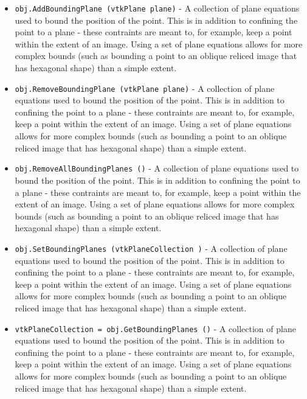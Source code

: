 \begin{itemize}
\item  \verb|obj.AddBoundingPlane (vtkPlane plane)| -  A collection of plane equations used to bound the position of the point.
 This is in addition to confining the point to a plane - these contraints
 are meant to, for example, keep a point within the extent of an image.
 Using a set of plane equations allows for more complex bounds (such as
 bounding a point to an oblique reliced image that has hexagonal shape)
 than a simple extent.

\item  \verb|obj.RemoveBoundingPlane (vtkPlane plane)| -  A collection of plane equations used to bound the position of the point.
 This is in addition to confining the point to a plane - these contraints
 are meant to, for example, keep a point within the extent of an image.
 Using a set of plane equations allows for more complex bounds (such as
 bounding a point to an oblique reliced image that has hexagonal shape)
 than a simple extent.

\item  \verb|obj.RemoveAllBoundingPlanes ()| -  A collection of plane equations used to bound the position of the point.
 This is in addition to confining the point to a plane - these contraints
 are meant to, for example, keep a point within the extent of an image.
 Using a set of plane equations allows for more complex bounds (such as
 bounding a point to an oblique reliced image that has hexagonal shape)
 than a simple extent.

\item  \verb|obj.SetBoundingPlanes (vtkPlaneCollection )| -  A collection of plane equations used to bound the position of the point.
 This is in addition to confining the point to a plane - these contraints
 are meant to, for example, keep a point within the extent of an image.
 Using a set of plane equations allows for more complex bounds (such as
 bounding a point to an oblique reliced image that has hexagonal shape)
 than a simple extent.

\item  \verb|vtkPlaneCollection = obj.GetBoundingPlanes ()| -  A collection of plane equations used to bound the position of the point.
 This is in addition to confining the point to a plane - these contraints
 are meant to, for example, keep a point within the extent of an image.
 Using a set of plane equations allows for more complex bounds (such as
 bounding a point to an oblique reliced image that has hexagonal shape)
 than a simple extent.


\end{itemize}
